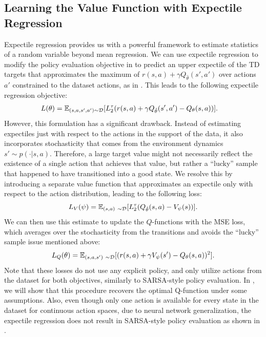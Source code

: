\documentclass{article} %
\begin{document}
\subsection{Learning the Value Function with Expectile Regression}

Expectile regression provides us with a powerful framework to estimate statistics of a random variable beyond mean regression. We can use expectile regression to modify the policy evaluation objective in  to predict an upper expectile of the TD targets that approximates the maximum of $r(s,a) + \gamma Q_{\hat{\theta}}(s',a')$ over actions $a'$ constrained to the dataset actions, as in .
This leads to the following expectile regression objective:
\begin{align*}
&L(\theta)=\mathbb{E}_{(s,a,s',a')\sim\mathcal{D}}[L_2^\tau(r(s,a) + \gamma Q_{\hat{\theta}}(s', a')- Q_\theta(s,a))].
\end{align*}
However, this formulation has a significant drawback. Instead of estimating expectiles just with respect to the actions in the support of the data, it also incorporates stochasticity that comes from the environment dynamics $s'\sim p(\cdot|s,a)$. Therefore, a large target value might not necessarily reflect the existence of a single action that achieves that value, but rather a ``lucky'' sample that happened to have transitioned into a good state.
We resolve this by introducing a separate value function that approximates an expectile only with respect to the action distribution, leading to the following loss:
\begin{equation}
    \label{eqn:fit_v}
    L_V(\psi) = \mathbb{E}_{(s,a)~\sim \mathcal{D}}[L_2^\tau(Q_{\hat{\theta}}(s,a) - V_\psi(s))].
\end{equation}
We can then use this estimate to update the $Q$-functions with the MSE loss, which averages over the stochasticity from the transitions and avoids the ``lucky'' sample issue mentioned above:
\begin{equation}
    \label{eqn:fit_q}
    L_Q(\theta) = \mathbb{E}_{(s,a,s')~\sim \mathcal{D}}[(r(s,a) + \gamma V_\psi(s') - Q_{\theta}(s,a))^2].
\end{equation}
Note that these losses do not use any explicit policy, and only utilize actions from the dataset for both objectives, similarly to SARSA-style policy evaluation.
In , we will show that this procedure recovers the optimal Q-function under some assumptions. Also, even though only one action is available for every state in the dataset for continuous action spaces, due to neural network generalization, the expectile regression does not result in SARSA-style policy evaluation as shown in .
\end{document}
